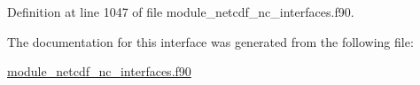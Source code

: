 Definition at line 1047 of file module\+\_\+netcdf\+\_\+nc\+\_\+interfaces.\+f90.



The documentation for this interface was generated from the following file\+:\begin{DoxyCompactItemize}
\item 
\hyperlink{module__netcdf__nc__interfaces_8f90}{module\+\_\+netcdf\+\_\+nc\+\_\+interfaces.\+f90}\end{DoxyCompactItemize}
